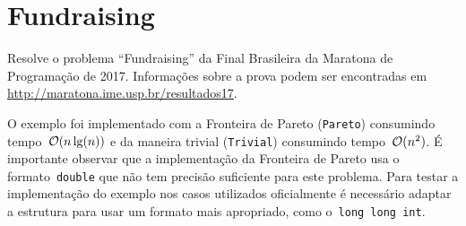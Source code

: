 
\section{Fundraising} \label{Fundraising}

Resolve o problema ``Fundraising'' da Final Brasileira da Maratona de Programação de 2017. Informações sobre a prova podem ser encontradas em \href{http://maratona.ime.usp.br/resultados17}{http://maratona.ime.usp.br/resultados17}.

O exemplo foi implementado com a Fronteira de Pareto (\texttt{Pareto}) consumindo tempo~$\mathcal{O}(n\lg(n))$ e da maneira trivial (\texttt{Trivial}) consumindo tempo~$\mathcal{O}(n^2)$. É importante observar que a implementação da Fronteira de Pareto usa o formato~\texttt{double} que não tem precisão suficiente para este problema. Para testar a implementação do exemplo nos casos utilizados oficialmente é necessário adaptar a estrutura para usar um formato mais apropriado, como o~\texttt{long long int}.
